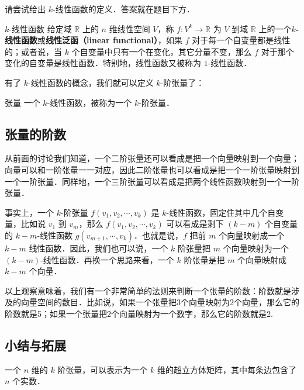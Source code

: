 \begin{exercise}{}
请尝试给出 $k$-线性函数的定义．答案就在题目下方．
\end{exercise}

\begin{definition}{$k$-线性函数}
给定域 $\mathbb{R}$ 上的 $n$ 维线性空间 $V$，称 $f:V^k\rightarrow \mathbb{R}$ 为 $V$ 到域 $\mathbb{R}$ 上的一个\textbf{$k$-线性函数}或\textbf{线性泛函（linear functional）}，如果 $f$ 对于每一个自变量都是线性的；或者说，当 $k$ 个自变量中只有一个在变化，其它分量不变，那么 $f$ 对于那个变化的自变量是线性函数．特别地，线性函数又被称为 $1$-线性函数．
\end{definition}

有了 $k$-线性函数的概念，我们就可以定义 $k$-阶张量了：

\begin{definition}{张量}
一个 $k$-线性函数，被称为一个 $k$-阶张量．
\end{definition}

\subsection{张量的阶数}

从前面的讨论我们知道，一个二阶张量还可以看成是把一个向量映射到一个向量；向量可以和一阶张量一一对应，因此二阶张量也可以看成是把一个一阶张量映射到一个一阶张量．同样地，一个三阶张量可以看成是把两个线性函数映射到一个一阶张量．

事实上，一个 $k$-阶张量 $f({v}_1, {v}_2, \cdots,{v}_k)$ 是 $k$-线性函数，固定住其中几个自变量，比如说 ${v}_1$ 到 ${v}_m$，那么 $f({v}_1, {v}_2,\cdots,{v}_k)$ 可以看成是剩下 $(k-m)$ 个自变量的 $k-m$-线性函数 $g({v}_{m+1}, \cdots,{v}_k)$．也就是说，$f$ 把前 $m$ 个向量映射成一个 $k-m$ 线性函数．因此，我们也可以说，一个 $k$ 阶张量把 $m$ 个向量映射为一个 $(k-m)$-线性函数．再换一个思路来看，一个 $k$ 阶张量是把 $m$ 个向量映射成 $k-m$ 个向量．

以上观察意味着，我们有一个非常简单的法则来判断一个张量的阶数：阶数就是涉及的向量空间的数目．比如说，如果一个张量把3个向量映射为2个向量，那么它的阶数就是5；如果一个张量把2个向量映射为一个数字，那么它的阶数就是2. 

\subsection{小结与拓展}

一个 $n$ 维的 $k$ 阶张量，可以表示为一个 $k$ 维的超立方体矩阵，其中每条边包含了 $n$ 个实数．

